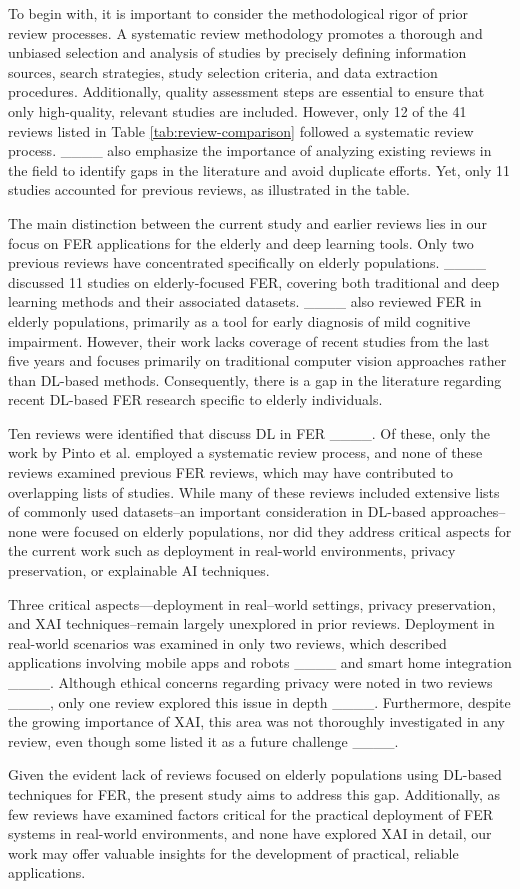        
        To begin with, it is important to consider the methodological rigor of prior review processes. A systematic review methodology promotes a thorough and unbiased selection and analysis of studies by precisely defining information sources, search strategies, study selection criteria, and data extraction procedures. Additionally, quality assessment steps are essential to ensure that only high-quality, relevant studies are included. However, only 12 of the 41 reviews listed in Table \ref{tab:review-comparison} followed a systematic review process. ____ also emphasize the importance of analyzing existing reviews in the field to identify gaps in the literature and avoid duplicate efforts. Yet, only 11 studies accounted for previous reviews, as illustrated in the table.
        
        The main distinction between the current study and earlier reviews lies in our focus on FER applications for the elderly and deep learning tools. Only two previous reviews have concentrated specifically on elderly populations. ____ discussed 11 studies on elderly-focused FER, covering both traditional and deep learning methods and their associated datasets. ____ also reviewed FER in elderly populations, primarily as a tool for early diagnosis of mild cognitive impairment. However, their work lacks coverage of recent studies from the last five years and focuses primarily on traditional computer vision approaches rather than DL-based methods. Consequently, there is a gap in the literature regarding recent DL-based FER research specific to elderly individuals.
        
        Ten reviews were identified that discuss DL in FER ____. Of these, only the work by Pinto et al. employed a systematic review process, and none of these reviews examined previous FER reviews, which may have contributed to overlapping lists of studies. While many of these reviews included extensive lists of commonly used datasets--an important consideration in DL-based approaches--none were focused on elderly populations, nor did they address critical aspects for the current work such as deployment in real-world environments, privacy preservation, or explainable AI techniques.
        
        Three critical aspects—deployment in real--world settings, privacy preservation, and XAI techniques--remain largely unexplored in prior reviews. Deployment in real-world scenarios was examined in only two reviews, which described applications involving mobile apps and robots ____ and smart home integration ____. Although ethical concerns regarding privacy were noted in two reviews ____, only one review explored this issue in depth ____. Furthermore, despite the growing importance of XAI, this area was not thoroughly investigated in any review, even though some listed it as a future challenge ____.
        
        Given the evident lack of reviews focused on elderly populations using DL-based techniques for FER, the present study aims to address this gap. Additionally, as few reviews have examined factors critical for the practical deployment of FER systems in real-world environments, and none have explored XAI in detail, our work may offer valuable insights for the development of practical, reliable applications.